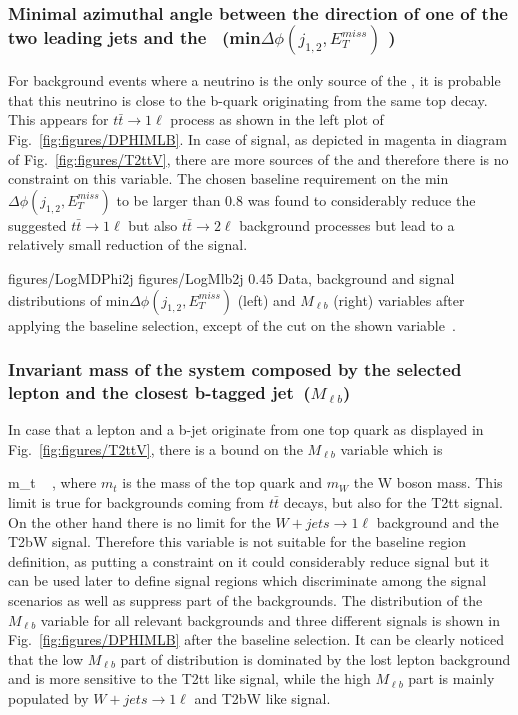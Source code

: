 \subsubsection{Minimal azimuthal angle between the direction of one of the two leading jets and the \MET~(min$\Delta \phi (j_{1,2}, E_{T}^{miss})$ )}

For background events where a neutrino is the only source of the \MET, it is probable that this neutrino is close to the b-quark  originating from the same top decay. This appears for $t\bar{t} \to 1\ell$ process as shown in the left plot of Fig.~\ref{fig:figures/DPHIMLB}. In case of signal, as depicted in magenta in diagram of Fig.~\ref{fig:figures/T2ttV}, there are more sources of the \MET and therefore there is no constraint on this variable. The chosen baseline requirement on the min$\Delta \phi (j_{1,2}, E_{T}^{miss})$ to be larger than 0.8 was found to considerably reduce the suggested $t\bar{t} \to 1\ell$ but also $t\bar{t} \to 2\ell$  background processes but lead to a relatively small reduction of the signal.

                 {figures/LogMDPhi2j} %
                 {figures/LogMlb2j} %
                 {0.45}       %
                 { Data, background and signal distributions of min$\Delta \phi (j_{1,2}, E_{T}^{miss})$ (left) and $M_{\ell b}$ (right) variables after applying the baseline selection, except of the cut on the shown variable~\cite{website:stopSupp}. }

\subsubsection{Invariant mass of the system composed by the selected lepton and the closest b-tagged jet~($M_{\ell b}$)}

In case that a lepton and a b-jet originate from one top quark as displayed in Fig.~\ref{fig:figures/T2ttV}, there is a bound on the $M_{\ell b}$ variable which is

{
 m_{t}  ~ ,
}
where $m_{t}$ is the mass of the top quark and $m_{W}$ the W boson mass. This limit is true for backgrounds coming from $t\bar{t}$ decays, but also for the T2tt signal. On the other hand there is no limit for the $W+jets \to 1\ell$  background and the T2bW signal. Therefore this variable is not suitable for the baseline region definition, as putting a constraint on it could considerably reduce signal but it can be used later to define signal regions which discriminate among the signal scenarios as well as suppress part of the backgrounds. The distribution of the  $M_{\ell b}$ variable for all relevant backgrounds and three different signals is shown in Fig.~\ref{fig:figures/DPHIMLB} after the baseline selection. It can be clearly noticed that the low $M_{\ell b}$ part of distribution is dominated by the lost lepton background and is more sensitive to the T2tt like signal, while the high $M_{\ell b}$ part is mainly populated by $W+jets \to 1\ell$  and T2bW like signal.

